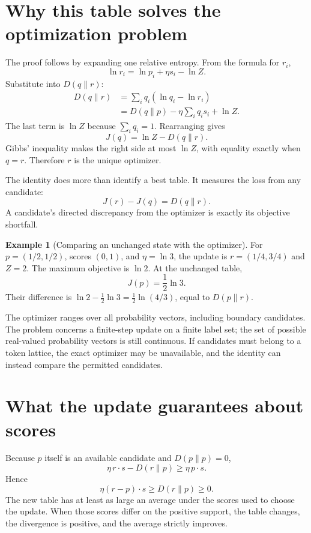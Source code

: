 \documentclass[11pt,oneside,openany]{book}
\theoremstyle{definition}
\newtheorem{example}{Example}[chapter]
\theoremstyle{remark}
\numberwithin{equation}{chapter}
\begin{document}
\section{Why this table solves the optimization problem}\label{ch09-why-this-table-solves-the-optimization-problem}

The proof follows by expanding one relative entropy. From the formula for \(r_i\), \[\ln r_i=\ln p_i+\eta s_i-\ln Z.\] Substitute into \(D(q\|r)\): \[\begin{aligned}
D(q\|r)
&=\sum_i q_i(\ln q_i-\ln r_i)\\
&=D(q\|p)-\eta\sum_iq_i s_i+\ln Z.
\end{aligned}\] The last term is \(\ln Z\) because \(\sum_iq_i=1\). Rearranging gives \[\boxed{J(q)=\ln Z-D(q\|r).}\] Gibbs' inequality makes the right side at most \(\ln Z\), with equality exactly when \(q=r\). Therefore \(r\) is the unique optimizer.

The identity does more than identify a best table. It measures the loss from any candidate: \[J(r)-J(q)=D(q\|r).\] A candidate's directed discrepancy from the optimizer is exactly its objective shortfall.

\begin{example}[Comparing an unchanged state with the optimizer]

For \(p=(1/2,1/2)\), scores \((0,1)\), and \(\eta=\ln3\), the update is \(r=(1/4,3/4)\) and \(Z=2\). The maximum objective is \(\ln2\). At the unchanged table, \[J(p)=\frac12\ln3.\] Their difference is \(\ln2-\tfrac12\ln3=\tfrac12\ln(4/3)\), equal to \(D(p\|r)\).

\end{example}

The optimizer ranges over all probability vectors, including boundary candidates. The problem concerns a finite-step update on a finite label set; the set of possible real-valued probability vectors is still continuous. If candidates must belong to a token lattice, the exact optimizer may be unavailable, and the identity can instead compare the permitted candidates.

\section{What the update guarantees about scores}\label{ch09-what-the-update-guarantees-about-scores}

Because \(p\) itself is an available candidate and \(D(p\|p)=0\), \[\eta\,r\cdot s-D(r\|p)\geq\eta\,p\cdot s.\] Hence \[\boxed{\eta(r-p)\cdot s\geq D(r\|p)\geq0.}\] The new table has at least as large an average under the scores used to choose the update. When those scores differ on the positive support, the table changes, the divergence is positive, and the average strictly improves.
\end{document}
